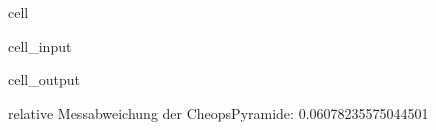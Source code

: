 \documentclass[letterpaper,10pt,english]{jupyterBook}
\begin{document}
\begin{sphinxuseclass}{cell}\begin{sphinxVerbatimInput}

\begin{sphinxuseclass}{cell_input}
\begin{sphinxVerbatim}[commandchars=\\\{\}]
     
            
    
  
\end{sphinxVerbatim}

\end{sphinxuseclass}\end{sphinxVerbatimInput}
\begin{sphinxVerbatimOutput}

\begin{sphinxuseclass}{cell_output}
\begin{sphinxVerbatim}[commandchars=\\\{\}]
relative Messabweichung der Cheops\PYGZhy{}Pyramide:  0.06078235575044501 \PYGZpc{}
\end{sphinxVerbatim}

\end{sphinxuseclass}\end{sphinxVerbatimOutput}

\end{sphinxuseclass}
\sphinxAtStartPar
{}
\end{document}
